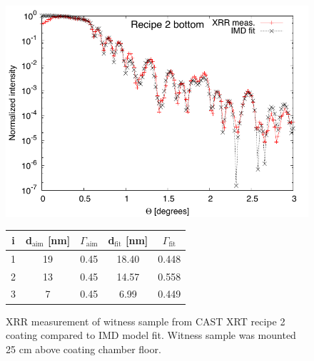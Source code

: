 \begin{figure}[h!]
\centering
\begin{minipage}{.47\textwidth}
  \centering
  \includegraphics[width=\linewidth]{figures/cast/cast_recipe2_fit2.pdf}
\end{minipage}%
\begin{minipage}{.53\textwidth}
  \centering
  \footnotesize
\begin{tabular}{c|c|c|c|c}
i&d$_{\text{aim}}$ [nm]&$\Gamma_{\text{aim}}$&d$_{\text{fit}}$ [nm]&$\Gamma_{\text{fit}}$\\
\hline
1&19&0.45&18.40&0.448\\
2&13&0.45&14.57&0.558\\
3&7&0.45&6.99&0.449
\end{tabular}
\end{minipage}
\caption{\footnotesize XRR measurement of witness sample from CAST XRT recipe 2 coating compared to IMD model fit. Witness sample was mounted 25 cm above coating chamber floor.}\label{fig:cast_fit_rec2-2}
\end{figure}

